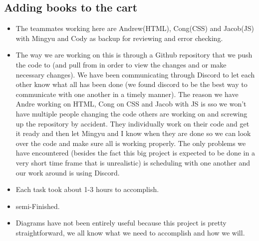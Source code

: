 \documentclass[12pt]{article}
\begin{document}
		\subsection{Adding books to the cart}
		\begin{itemize}

		\item The teammates working here are Andrew(HTML), Cong(CSS) and Jacob(JS) with Mingyu and Cody as backup for reviewing and error checking.

		\item The way we are working on this is through a Github repository that we push the code to (and pull from in order to view the changes and or make necessary changes).  We have been communicating through Discord to let each other know what all has been done (we found discord to be the best way to communicate with one another in a timely manner).  The reason we have Andre working on HTML, Cong on CSS and Jacob with JS is sso we won’t have multiple people changing the code others are working on and screwing up the repository by accident.  They individually work on their code and get it ready and then let Mingyu and I know when they are done so we can look over the code and make sure all is working properly.  The only problems we have encountered (besides the fact this big project is expected to be done in a very short time frame that is unrealistic) is scheduling with one another and our work around is using Discord.

		\item Each task took about 1-3 hours to accomplish.

		\item semi-Finished.

		\item Diagrams have not been entirely useful because this project is pretty straightforward, we all know what we need to accomplish and how we will.

		\end{itemize}
\end{document}

